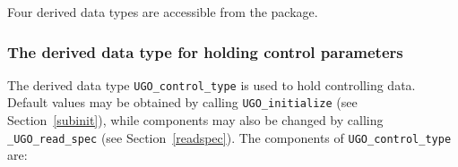 \documentclass{galahad}
\newcommand{\packagename}{UGO}
\newcommand{\fullpackagename}{\libraryname\_\packagename}
\begin{document}

\galtypes
Four derived data types are accessible from the package.


\subsubsection{The derived data type for holding control
 parameters}\label{typecontrol}
The derived data type
{\tt \packagename\_control\_type}
is used to hold controlling data. Default values may be obtained by calling
{\tt \packagename\_initialize}
(see Section~\ref{subinit}),
while components may also be changed by calling
{\tt \fullpackagename\_read\-\_spec}
(see Section~\ref{readspec}).
The components of
{\tt \packagename\_control\_type}
are:
\end{document}

